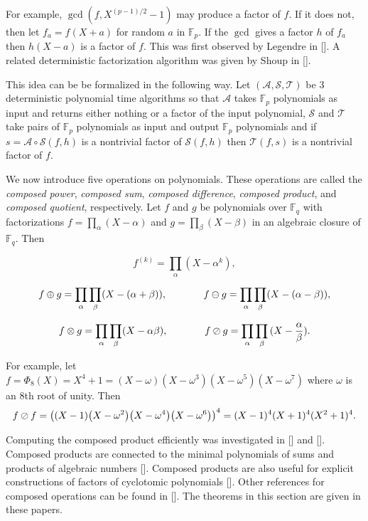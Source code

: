 \documentclass{article}
\let\originalleft\left
\let\originalright\right
\renewcommand{\left}{\mathopen{}\mathclose\bgroup\originalleft}
\renewcommand{\right}{\aftergroup\egroup\originalright}
\theoremstyle{plain}
\theoremstyle{definition}
\def\Fp {{ \mathbb{F} _ {p} }}
\def\Fq {{ \mathbb{F} _ {q} }}
\def\mcA  {{ \mathcal{A}}}
\def\mcS  {{ \mathcal{S}}}
\def\mcT  {{ \mathcal{T}}}
\begin{document}
		For example, $\gcd(f,X^{(p-1)/2}-1)$ may produce a factor of $f$. If it does not, then let $f_a=f(X+a)$ for random $a$ in $\Fp$. If the $\gcd$ gives a factor $h$ of $f_a$ then $h(X-a)$ is a factor of $f$. This was first observed by Legendre in []. A related deterministic factorization algorithm was given by Shoup in []. 
		
		This idea can be be formalized in the following way. Let $(\mcA,\mcS,\mcT)$ be 3 deterministic polynomial time algorithms so that $\mcA$ takes $\Fp$ polynomials as input and returns either nothing or a factor of the input polynomial, $\mcS$ and $\mcT$ take pairs of $\Fp$ polynomials as input and output $\Fp$ polynomials and if $s=\mcA \circ \mcS(f,h)$ is a nontrivial factor of $\mcS(f,h)$ then $\mcT(f,s)$ is a nontrivial factor of $f$. 
		
		We now introduce five operations on polynomials. These operations are called the \emph{composed power}, \emph{composed sum}, \emph{composed difference}, \emph{composed product}, and \emph{composed quotient}, respectively. Let $f$ and $g$ be polynomials over $\Fq$ with factorizations $f=\prod_{\alpha}{(X-\alpha)}$ and $g=\prod_{\beta}{(X-\beta)}$ in an algebraic closure of $\Fq$. Then
		
		\[ f^{(k)} = \prod_{\alpha}({X-\alpha^k}), \]
		
		\[ f \oplus g = \prod_{\alpha}{\prod_{\beta}({X-(\alpha+\beta)})}, 
	      \hspace{13 mm} 
		    f \ominus g = \prod_{\alpha}{\prod_{\beta}({X-(\alpha-\beta}))}, \]
	
		\[ f \otimes g = \prod_{\alpha}{\prod_{\beta}({X-\alpha\beta})}, 
	      \hspace{13 mm} 
		    f \oslash g = \prod_{\alpha}{\prod_{\beta}{(X-\frac{\alpha}{\beta})}}. \]
				
		For example, let $f=\Phi_8(X)=X^4+1=(X-\omega)(X-\omega^3)(X-\omega^5)(X-\omega^7)$ where $\omega$ is an 8th root of unity. Then 
		\[ f \oslash f=\left( \left(X-1 \right)\left(X-\omega^2\right)\left(X-\omega^4\right)\left(X-\omega^6\right) \right)^4=(X-1)^4(X+1)^4(X^2+1)^4. \]
				
	  Computing the composed product efficiently was investigated in [] and  []. Composed products are connected to the minimal polynomials of sums and products of algebraic numbers []. Composed products are also useful for explicit constructions of factors of cyclotomic polynomials []. Other references for composed operations can be found in []. The theorems in this section are given in these papers. 		
			
\end{document}
